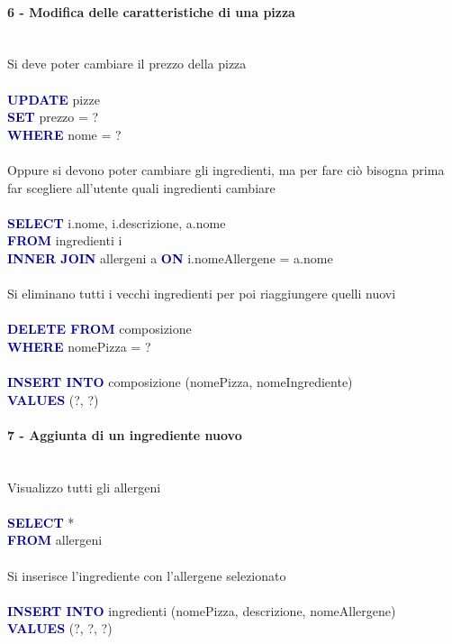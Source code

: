 \documentclass[a4paper,12pt, oneside]{article}
\begin{document}
\paragraph{6 - Modifica delle caratteristiche di una pizza}
\hphantom{A}\\    %
Si deve poter cambiare il prezzo della pizza
\\\\
\textcolor{darkBlue}{\textbf{UPDATE}} pizze
\\\textcolor{darkBlue}{\textbf{SET}} prezzo = ?
\\\textcolor{darkBlue}{\textbf{WHERE}} nome = ?
\\\\
Oppure si devono poter cambiare gli ingredienti, ma per fare ciò bisogna prima far scegliere all'utente quali ingredienti cambiare
\\\\
\textcolor{darkBlue}{\textbf{SELECT}} i.nome, i.descrizione, a.nome
\\\textcolor{darkBlue}{\textbf{FROM}} ingredienti i
\\\textcolor{darkBlue}{\textbf{INNER JOIN}} allergeni a \textcolor{darkBlue}{\textbf{ON}} i.nomeAllergene = a.nome
\\\\
Si eliminano tutti i vecchi ingredienti per poi riaggiungere quelli nuovi
\\\\
\textcolor{darkBlue}{\textbf{DELETE FROM}} composizione
\\\textcolor{darkBlue}{\textbf{WHERE}} nomePizza = ?
\\\\
\textcolor{darkBlue}{\textbf{INSERT INTO}} composizione (nomePizza, nomeIngrediente)
\\\textcolor{darkBlue}{\textbf{VALUES}} (?, ?)

\paragraph{7 - Aggiunta di un ingrediente nuovo}
\hphantom{A}\\    %
Visualizzo tutti gli allergeni
\\\\
\textcolor{darkBlue}{\textbf{SELECT}} *
\\\textcolor{darkBlue}{\textbf{FROM}} allergeni
\\\\
Si inserisce l'ingrediente con l'allergene selezionato
\\\\
\textcolor{darkBlue}{\textbf{INSERT INTO}} ingredienti (nomePizza, descrizione, nomeAllergene)
\\\textcolor{darkBlue}{\textbf{VALUES}} (?, ?, ?)
\end{document}
